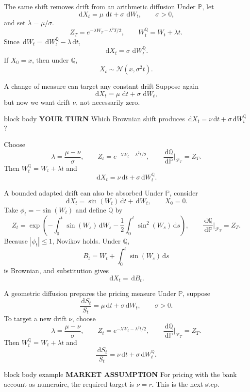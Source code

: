\documentclass[handout,10pt,aspectratio=169]{beamer}
\newenvironment{marketbox}{\begin{beamercolorbox}[rounded=true,sep=0.7em,wd=\textwidth]{block body example}
  \textbf{\color{CourseGreen}MARKET ASSUMPTION}\quad}{\end{beamercolorbox}}
\newenvironment{pausebox}{\begin{beamercolorbox}[rounded=true,sep=0.8em,wd=\textwidth]{block body}
  \textbf{\color{CourseGold}YOUR TURN}\quad}{\end{beamercolorbox}}
\newcommand{\dd}{\,\mathrm d}
\newcommand{\Pp}{\mathbb P}
\newcommand{\Q}{\mathbb Q}
\newcommand{\cF}{\mathcal F}
\newcommand{\1}{\mathbf 1}
\newcommand{\Nlaw}{\mathcal N}
\begin{document}
\begin{frame}{The same shift removes drift from an arithmetic diffusion}
Under \(\Pp\), let
\[
\dd X_t=\mu\,\dd t+\sigma\,\dd W_t,
\qquad \sigma>0,
\]
and set \(\lambda=\mu/\sigma\).
\[
Z_T=e^{-\lambda W_T-\lambda^2T/2},
\qquad
W_t^\Q=W_t+\lambda t.
\]
Since \(\dd W_t=\dd W_t^\Q-\lambda\dd t\),
\[
\boxed{\dd X_t=\sigma\,\dd W_t^\Q.}
\]
If \(X_0=x\), then under \(\Q\),
\[
\boxed{X_t\sim\Nlaw(x,\sigma^2t).}
\]
\end{frame}

\begin{frame}{A change of measure can target any constant drift}
Suppose again
\[
\dd X_t=\mu\,\dd t+\sigma\,\dd W_t,
\]
but now we want drift \(\nu\), not necessarily zero.
\begin{pausebox}
Which Brownian shift produces \(\dd X_t=\nu\dd t+\sigma\dd W_t^\Q\)?
\end{pausebox}

Choose
\[
\lambda=\frac{\mu-\nu}{\sigma},
\qquad
Z_t=e^{-\lambda W_t-\lambda^2t/2},
\qquad
\frac{\dd\Q}{\dd\Pp}\bigg|_{\cF_T}=Z_T.
\]
Then \(W_t^\Q=W_t+\lambda t\) and
\[
\boxed{\dd X_t=\nu\dd t+\sigma\dd W_t^\Q.}
\]
\end{frame}

\begin{frame}{A bounded adapted drift can also be absorbed}
Under \(\Pp\), consider
\[
\dd X_t=\sin(W_t)\dd t+\dd W_t,\qquad X_0=0.
\]
Take \(\phi_t=-\sin(W_t)\) and define \(\Q\) by
\[
Z_t=\exp\!\left(
-\int_0^t\sin(W_s)\dd W_s
-\frac12\int_0^t\sin^2(W_s)\dd s
\right),\qquad
\frac{\dd\Q}{\dd\Pp}\bigg|_{\cF_T}=Z_T.
\]
Because \(|\phi_t|\le1\), Novikov holds. Under \(\Q\),
\[
B_t=W_t+\int_0^t\sin(W_s)\dd s
\]
is Brownian, and substitution gives
\[
\boxed{\dd X_t=\dd B_t.}
\]
\end{frame}

\begin{frame}{A geometric diffusion prepares the pricing measure}
Under \(\Pp\), suppose
\[
\frac{\dd S_t}{S_t}=\mu\dd t+\sigma\dd W_t,
\qquad \sigma>0.
\]
To target a new drift \(\nu\), choose
\[
\lambda=\frac{\mu-\nu}{\sigma},
\qquad
Z_t=e^{-\lambda W_t-\lambda^2t/2},
\qquad
\frac{\dd\Q}{\dd\Pp}\bigg|_{\cF_T}=Z_T.
\]
Then \(W_t^\Q=W_t+\lambda t\) and
\[
\boxed{\frac{\dd S_t}{S_t}
=\nu\dd t+\sigma\dd W_t^\Q.}
\]
\begin{marketbox}
For pricing with the bank account as numeraire, the required target is
\(\nu=r\). This is the next step.
\end{marketbox}
\end{frame}
\end{document}

